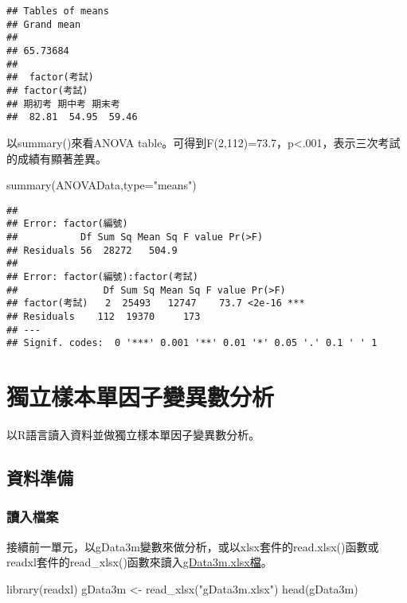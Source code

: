 \documentclass[
]{book}
\newenvironment{Shaded}{\begin{snugshade}}{\end{snugshade}}
\newcommand{\AttributeTok}[1]{\textcolor[rgb]{0.77,0.63,0.00}{#1}}
\newcommand{\FunctionTok}[1]{\textcolor[rgb]{0.00,0.00,0.00}{#1}}
\newcommand{\NormalTok}[1]{#1}
\newcommand{\OtherTok}[1]{\textcolor[rgb]{0.56,0.35,0.01}{#1}}
\newcommand{\StringTok}[1]{\textcolor[rgb]{0.31,0.60,0.02}{#1}}
\begin{document}
\begin{verbatim}
## Tables of means
## Grand mean
##          
## 65.73684 
## 
##  factor(考試) 
## factor(考試)
## 期初考 期中考 期末考 
##  82.81  54.95  59.46
\end{verbatim}

以summary()來看ANOVA table。可得到F(2,112)=73.7，p\textless.001，表示三次考試的成績有顯著差異。

\begin{Shaded}
\begin{Highlighting}[]
\FunctionTok{summary}\NormalTok{(ANOVAData,}\AttributeTok{type=}\StringTok{"means"}\NormalTok{)}
\end{Highlighting}
\end{Shaded}

\begin{verbatim}
## 
## Error: factor(編號)
##           Df Sum Sq Mean Sq F value Pr(>F)
## Residuals 56  28272   504.9               
## 
## Error: factor(編號):factor(考試)
##               Df Sum Sq Mean Sq F value Pr(>F)    
## factor(考試)   2  25493   12747    73.7 <2e-16 ***
## Residuals    112  19370     173                   
## ---
## Signif. codes:  0 '***' 0.001 '**' 0.01 '*' 0.05 '.' 0.1 ' ' 1
\end{verbatim}

\hypertarget{between1way}{%
\chapter{獨立樣本單因子變異數分析}\label{between1way}}

以R語言讀入資料並做獨立樣本單因子變異數分析。

\hypertarget{ux8cc7ux6599ux6e96ux5099-1}{%
\section{資料準備}\label{ux8cc7ux6599ux6e96ux5099-1}}

\hypertarget{ux8b80ux5165ux6a94ux6848-4}{%
\subsection{讀入檔案}\label{ux8b80ux5165ux6a94ux6848-4}}

接續前一單元，以gData3m變數來做分析，或以xlsx套件的read.xlsx()函數或readxl套件的read\_xlsx()函數來讀入\href{https://docs.google.com/spreadsheets/d/1kJlbaSGZ5ioTz6DZ56yHLYxjDWO9t92t/edit\#gid=1205378113}{gData3m.xlsx檔}。

\begin{Shaded}
\begin{Highlighting}[]
\FunctionTok{library}\NormalTok{(readxl)}
\NormalTok{gData3m }\OtherTok{\textless{}{-}} \FunctionTok{read\_xlsx}\NormalTok{(}\StringTok{"gData3m.xlsx"}\NormalTok{)}
\FunctionTok{head}\NormalTok{(gData3m)}
\end{Highlighting}
\end{Shaded}
\end{document}

